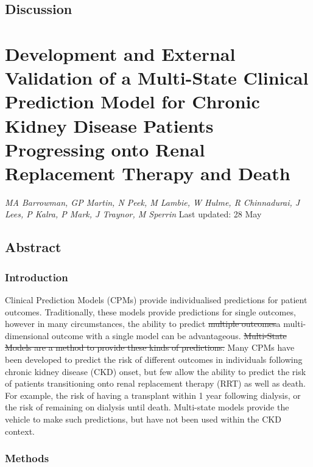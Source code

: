 \documentclass[12pt,PhD,twoside,openright]{muthesis}
\begin{document}
\hypertarget{discussion-3}{%
\section{Discussion}\label{discussion-3}}

\hypertarget{chap-dev-paper}{%
\chapter{Development and External Validation of a Multi-State Clinical Prediction Model for Chronic Kidney Disease Patients Progressing onto Renal Replacement Therapy and Death}\label{chap-dev-paper}}

\emph{MA Barrowman, GP Martin, N Peek, M Lambie, W Hulme, R Chinnadurai, J Lees, P Kalra, P Mark, J Traynor, M Sperrin}
Last updated: 28 May

\hypertarget{abstract-2}{%
\section*{Abstract}\label{abstract-2}}

\hypertarget{introduction-6}{%
\subsection*{Introduction}\label{introduction-6}}

Clinical Prediction Models (CPMs) provide individualised predictions for patient outcomes. Traditionally, these models provide predictions for single outcomes, however in many circumstances, the ability to predict \sout{multiple outcomes}a multi-dimensional outcome with a single model can be advantageous. \sout{Multi-State Models are a method to provide these kinds of predictions.} Many CPMs have been developed to predict the risk of different outcomes in individuals following chronic kidney disease (CKD) onset, but few allow the ability to predict the risk of patients transitioning onto renal replacement therapy (RRT) as well as death. For example, the risk of having a transplant within 1 year following dialysis, or the risk of remaining on dialysis until death. Multi-state models provide the vehicle to make such predictions, but have not been used within the CKD context.

\hypertarget{methods-5}{%
\subsection*{Methods}\label{methods-5}}
\end{document}

